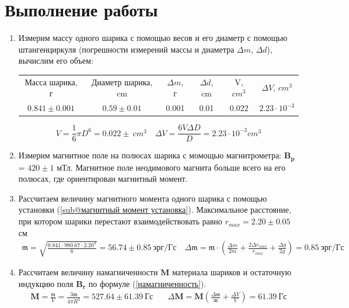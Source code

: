 \documentclass[a4paper, 10pt]{article}
\begin{document}
\section*{Выполнение работы}
\begin{enumerate}
    \item Измерим массу одного шарика с помощью весов и его диаметр с помощью штангенциркуля (погрешности измерений массы и диаметра $\Delta m$, $\Delta d$), вычислим его объем:
    \begin{center}
    \begin{tabular}{|c|c|c|c|c|c|}
            \hline
            Масса шарика, г & Диаметр шарика, cm & $\Delta m$, г & $\Delta d$, cm & V, $cm^{3}$ & $\Delta V$, $cm^{3}$\\
            $0.841\pm 0.001$ & $0.59\pm 0.01$ & 0.001 & 0.01 & 0.022 & $2.23\cdot 10^{-3}$\\
            \hline
        \end{tabular}
    \end{center}
    \begin{equation*}
        V = \frac{1}{6}\pi D^{6} = 0.022\pm \ cm^{3} \quad \Delta V = \frac{6V\Delta D}{D} = 2.23\cdot 10^{-3} cm^{3}
    \end{equation*}
    \item Измерим магнитное поле на полюсах шарика с момощью магнитрометра: $\mathbf{B_{p}}$ = $420\pm 1$ мТл. Магнитное поле неодимового магнита больше всего
    на его полюсах, где ориентирован магнитный момент.
    \item Рассчитаем величину магнитного момента одного шарика с помощью установки (\ref{sub@магнитный момент установка}). Максимальное
    расстояние, при котором шарики перестают взаимодействовать равно $r_{max} = 2.20\pm 0.05$ см
    \begin{align*}
        \mathfrak{m} = \sqrt{\frac{0.841\cdot 980.67\cdot 2.20^{4}}{6}} = 56.74\pm 0.85\ \text{эрг/Гс} \quad
        \Delta \mathfrak{m} = {\mathfrak{m}}\cdot \left(\frac{\Delta m}{2m} + \frac{2\Delta r_{max}}{r_{max}} + \frac{\Delta g}{2g}\right) = 0.85\ \text{эрг/Гс}
    \end{align*}
    \item Рассчитаем величину намагниченности $\mathbf{M}$ материала шариков и остаточную индукцию поля $\mathbf{B_{r}}$ по формуле (\ref{намагниченность}).
    \begin{align*}
        \mathbf{M} = \frac{\mathfrak{m}}{V} = \frac{3\mathfrak{m}}{4\pi R^{3}} = 527.64\pm 61.39\ \text{Гс} & \quad \Delta \mathbf{M} = \mathbf{M}\left(\frac{\Delta \mathfrak{m}}{\mathfrak{m}} + \frac{\Delta V}{V}\right) = 61.39\ \text{Гс}\\

\end{align*}
\end{enumerate}
\end{document}
